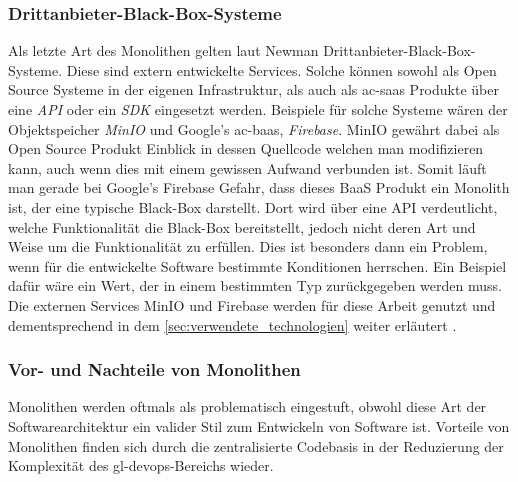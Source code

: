     \subsubsection{Drittanbieter-Black-Box-Systeme}
    Als letzte Art des Monolithen gelten laut Newman Drittanbieter-Black-Box-Systeme. Diese sind extern entwickelte Services. Solche können sowohl als Open Source Systeme in der eigenen Infrastruktur, als auch als \gls{ac-saas} Produkte über eine \emph{API} oder ein \emph{SDK} eingesetzt werden. Beispiele für solche Systeme wären der Objektspeicher \emph{MinIO} und Google's \gls{ac-baas}, \emph{Firebase}. MinIO gewährt dabei als Open Source Produkt Einblick in dessen Quellcode welchen man modifizieren kann, auch wenn dies mit einem gewissen Aufwand verbunden ist. Somit läuft man gerade bei Google's Firebase Gefahr, dass dieses BaaS Produkt ein Monolith ist, der eine typische Black-Box darstellt. Dort wird über eine API verdeutlicht, welche Funktionalität die Black-Box bereitstellt, jedoch nicht deren Art und Weise um die Funktionalität zu erfüllen. Dies ist besonders dann ein Problem, wenn für die entwickelte Software bestimmte Konditionen herrschen. Ein Beispiel dafür wäre ein Wert, der in einem bestimmten Typ zurückgegeben werden muss. Die externen Services MinIO und Firebase werden für diese Arbeit genutzt und dementsprechend in dem \autoref{sec:verwendete_technologien} weiter erläutert \parencite{newman2019monolith}.

    \subsubsection{Vor- und Nachteile von Monolithen}
    Monolithen werden oftmals als problematisch eingestuft, obwohl diese Art der Softwarearchitektur ein valider Stil zum Entwickeln von Software ist. Vorteile von Monolithen finden sich durch die zentralisierte Codebasis in der Reduzierung der Komplexität des \gls{gl-devops}-Bereichs wieder.
    
